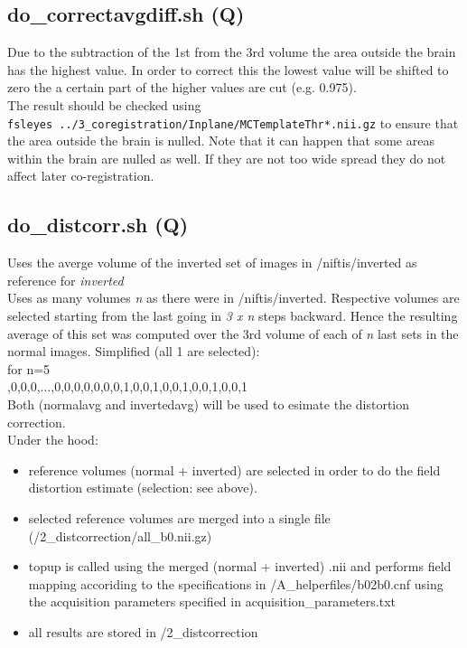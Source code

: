 \documentclass[12pt,a4paper]{scrartcl}
\begin{document}
\subsection{do\_correctavgdiff.sh (Q)}
\label{sh:corravg}
Due to the subtraction of the 1st from the 3rd volume the area outside the brain has the highest value. In order to correct this the lowest value will be shifted to zero the a certain part of the higher values are cut (e.g. 0.975).\\

\noindent The result should be checked using\\
\texttt{fsleyes ../3\_coregistration/Inplane/MCTemplateThr*.nii.gz} to ensure that the area outside the brain is nulled. Note that it can happen that some areas within the brain are nulled as well. If they are not too wide spread they do not affect later co-registration.\\

\subsection{do\_distcorr.sh (Q)}
\label{sh:distcorr}
Uses the averge volume of the inverted set of images in /niftis/inverted as reference for \textit{inverted}\\

\noindent Uses as many volumes \textit{n} as there were in /niftis/inverted. Respective volumes are selected starting from the last going in \textit{3 x n} steps backward. Hence the resulting average of this set was computed over the 3rd volume of each of \textit{n} last sets in the normal images. Simplified (all 1 are selected):\\

\noindent for n=5\\

,0,0,0,...,0,0,0,0,0,0,0,1,0,0,1,0,0,1,0,0,1,0,0,1\\

\noindent Both (normalavg and invertedavg) will be used to esimate the distortion correction.\\

\noindent Under the hood:
\begin{itemize}
\item reference volumes (normal + inverted) are selected in order to do the field distortion estimate (selection: see above).
\item selected reference volumes are merged into a single file (/2\_distcorrection/all\_b0.nii.gz)
\item topup is called using the merged (normal + inverted) .nii and performs field mapping accoriding to the specifications in /A\_helperfiles/b02b0.cnf using the acquisition parameters specified in acquisition\_parameters.txt
\item all results are stored in /2\_distcorrection
\end{itemize}
\end{document}
